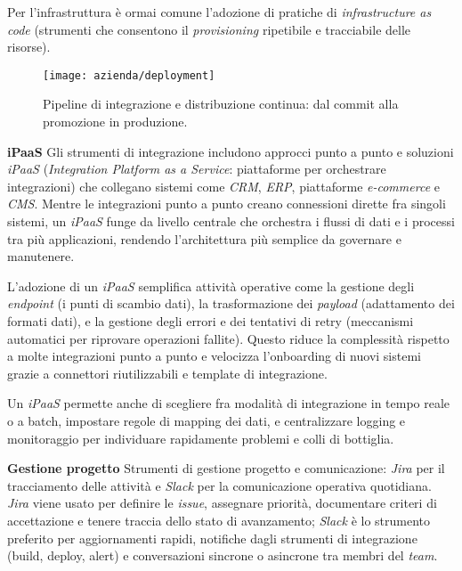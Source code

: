 Per l’infrastruttura è ormai comune l’adozione di pratiche di \emph{infrastructure as code} (strumenti che consentono il \emph{provisioning} ripetibile e tracciabile delle risorse). 

\begin{figure}[htbp]
    \centering
    \texttt{[image: azienda/deployment]}
    \caption{Pipeline di integrazione e distribuzione continua: dal commit alla promozione in produzione.}
    \label{fig:pipeline_cicd}
\end{figure}


\medskip
\noindent\textbf{iPaaS}
Gli strumenti di integrazione includono approcci punto a punto e soluzioni \emph{iPaaS} (\emph{Integration Platform as a Service}: piattaforme per orchestrare integrazioni) 
che collegano sistemi come \emph{CRM}, \emph{ERP}, piattaforme \emph{e-commerce} e \emph{CMS}. Mentre le integrazioni punto a punto creano connessioni dirette fra singoli sistemi, 
un \emph{iPaaS} funge da livello centrale che orchestra i flussi di dati e i processi tra più applicazioni, rendendo l’architettura più semplice da governare e manutenere.

L’adozione di un \emph{iPaaS} semplifica attività operative come la gestione degli \emph{endpoint} (i punti di scambio dati), la trasformazione dei \emph{payload} 
(adattamento dei formati dati), e la gestione degli errori e dei tentativi di retry (meccanismi automatici per riprovare operazioni fallite). 
Questo riduce la complessità rispetto a molte integrazioni punto a punto e velocizza l’onboarding di nuovi sistemi grazie a connettori riutilizzabili e template di integrazione.

Un \emph{iPaaS} permette anche di scegliere fra modalità di integrazione 
in tempo reale o a batch, impostare regole di mapping dei dati, e centralizzare logging e monitoraggio per individuare rapidamente problemi e colli di bottiglia.

\medskip
\noindent\textbf{Gestione progetto}
Strumenti di gestione progetto e comunicazione: \emph{Jira} per il tracciamento delle attività e \emph{Slack} per la comunicazione operativa quotidiana. \emph{Jira} 
viene usato per definire le \emph{issue}, assegnare priorità, documentare criteri di accettazione e tenere traccia dello stato di avanzamento; \emph{Slack} 
è lo strumento preferito per aggiornamenti rapidi, notifiche dagli strumenti di integrazione (build, deploy, alert) e conversazioni sincrone o asincrone tra membri del \emph{team}.

